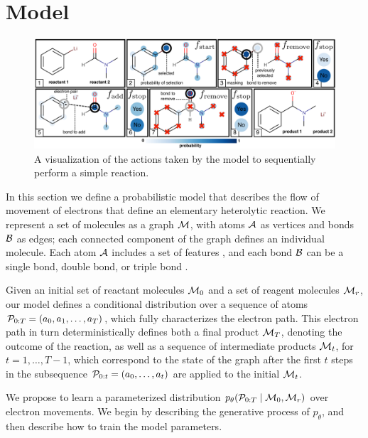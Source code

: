 
\section{Model}



\begin{figure}
\centering
\includegraphics[width=\textwidth]{reaction_model_blue}
\caption{A visualization of the actions taken by the model to sequentially perform a simple reaction.}
\label{fig:reaction_model}
\end{figure}



In this section we define a probabilistic model that describes the flow of movement of electrons that define an elementary heterolytic reaction.
We represent a set of molecules as a graph ${\mathcal{M}}$, with atoms ${\mathcal{A}}$ as vertices and bonds ${\mathcal{B}}$ as edges;
each connected component of the graph defines an individual molecule.
Each atom  ${\mathcal{A}}$ includes a set of features ,
and each bond ${\mathcal{B}}$ can be a single bond, double bond, or triple bond .

Given an initial set of reactant molecules ${\mathcal{M}}_0$ and a set of reagent molecules ${\mathcal{M}}_r$, 
our model defines a conditional distribution over a sequence of atoms ${\mathcal{P}}_{0:T} = (a_0, a_1, \ldots, a_T)$,
which fully characterizes the electron path.
This electron path in turn deterministically defines both a final product ${\mathcal{M}}_{T}$, 
denoting the outcome of the reaction,
as well as a sequence of intermediate products ${\mathcal{M}}_t$, for $t = 1,\dots,T-1$,
which correspond to the state of the graph after the first $t$ steps in the subsequence ${\mathcal{P}}_{0:t} = (a_0, \dots, a_t)$ are applied to the initial ${\mathcal{M}}_t$.


We propose to learn a parameterized distribution $p_\theta( {\mathcal{P}}_{0:T} \mid {\mathcal{M}}_0, {\mathcal{M}}_r)$ over electron movements. 
We begin by describing the generative process %
of $p_\theta$, and then describe how to train the model parameters.


